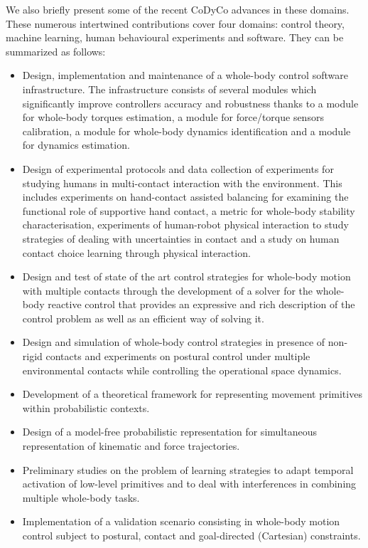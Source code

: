 \documentclass[final,5p,twocolumn]{elsarticle}
\begin{document}
We also briefly present some of the recent CoDyCo advances in these domains. These numerous intertwined contributions cover four domains: control theory, machine learning, human behavioural experiments and software. They can be summarized as follows:
\begin{itemize}
\item Design, implementation and maintenance of a whole-body control software infrastructure. The infrastructure consists of several modules which significantly improve  controllers accuracy and robustness thanks to a module for whole-body torques estimation, a module for force/torque sensors calibration, a module for whole-body dynamics identification and a module for dynamics estimation.
\item Design of experimental protocols and data collection of experiments for studying humans in multi-contact interaction with the environment. This includes experiments on hand-contact assisted balancing for examining the functional role of supportive hand contact, a metric for whole-body stability characterisation,  experiments of human-robot physical interaction to study strategies of dealing with uncertainties in contact and a study on human contact choice learning through physical interaction.
\item Design and test of state of the art control strategies for whole-body motion with multiple contacts through the development of a solver for the whole-body reactive control that provides an expressive and rich description of the control problem as well as an efficient way of solving it.
\item Design and simulation of whole-body control strategies in presence of non-rigid contacts and experiments on postural control under multiple environmental contacts while controlling the operational space dynamics.
\item Development of a theoretical framework for representing movement primitives within probabilistic contexts.
\item Design of a model-free probabilistic representation for simultaneous representation of kinematic and force trajectories.
\item Preliminary studies on the problem of learning strategies to adapt temporal activation of low-level primitives and to deal with interferences in combining multiple whole-body tasks.
\item Implementation of a validation scenario consisting in whole-body motion control subject to postural, contact and goal-directed (Cartesian) constraints.
\end{itemize}
\end{document}
